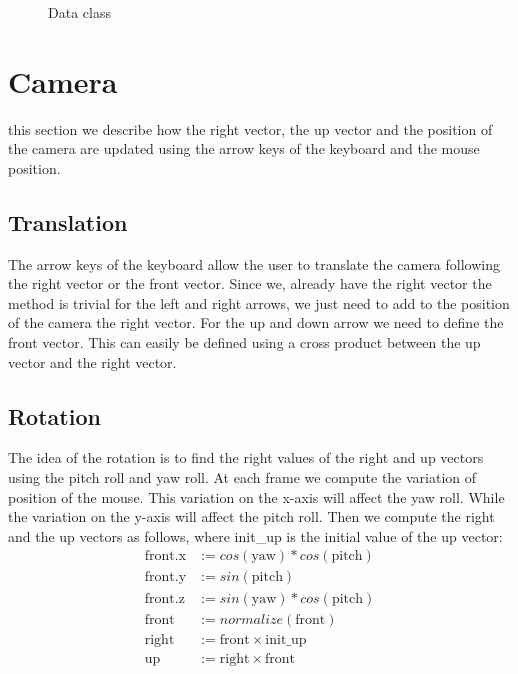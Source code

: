 \documentclass[a4paper,12pt,journal,twoside,compsoc]{PPIEEEtran}
\begin{document}
\begin{figure}
\centering
{}
\caption{Data class}
\label{Fig:umldata}
\end{figure}

\section{Camera}
\label{cam}
 this section we describe how the right vector, the up vector and the
position of the camera are updated using the arrow keys of the keyboard and the
mouse position.

\subsection{Translation}

The arrow keys of the keyboard allow the user to translate the camera following
the right vector or the front vector. Since we, already have the right vector
the method is trivial for the left and right arrows, we just need to add to the
position of the camera the right vector. For the up and down arrow we need to
define the front vector. This can easily be defined using a cross product between
the up vector and the right vector.

\subsection{Rotation}

The idea of the rotation is to find the right values of the right and up vectors
using the pitch roll and yaw roll. At each frame we compute the variation
of position of the mouse. This variation on the x-axis will affect the yaw
roll. While the variation on the y-axis will affect the pitch roll. Then
we compute the right and the up vectors as follows, where init\_up is the
initial value of the up vector:
\begin{align*}
  \text{front.x} &:= cos(\text{yaw}) * cos(\text{pitch}) \\
  \text{front.y} &:= sin(\text{pitch}) \\
  \text{front.z} &:= sin(\text{yaw}) * cos(\text{pitch}) \\
  \text{front} &:= normalize(\text{front}) \\
  \text{right} &:= \text{front} \times \text{init\_up} \\
  \text{up} &:= \text{right} \times \text{front} \\
\end{align*}
\end{document}
